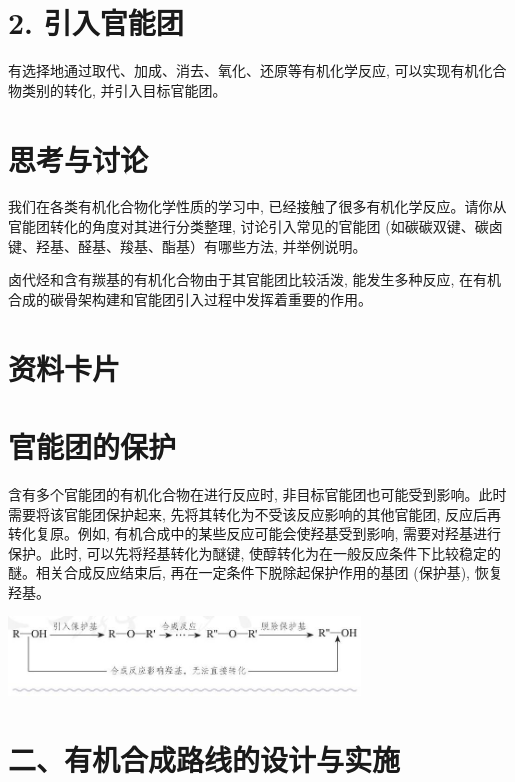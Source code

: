 \documentclass[10pt]{article}
\begin{document}
\section*{2. 引入官能团}

有选择地通过取代、加成、消去、氧化、还原等有机化学反应, 可以实现有机化合物类别的转化, 并引入目标官能团。

\section*{思考与讨论}

我们在各类有机化合物化学性质的学习中, 已经接触了很多有机化学反应。请你从官能团转化的角度对其进行分类整理, 讨论引入常见的官能团 (如碳碳双键、碳卤键、羟基、醛基、羧基、酯基）有哪些方法, 并举例说明。

卤代烃和含有羰基的有机化合物由于其官能团比较活泼, 能发生多种反应, 在有机合成的碳骨架构建和官能团引入过程中发挥着重要的作用。

\section*{资料卡片}

\section*{官能团的保护}

含有多个官能团的有机化合物在进行反应时, 非目标官能团也可能受到影响。此时需要将该官能团保护起来, 先将其转化为不受该反应影响的其他官能团, 反应后再转化复原。例如, 有机合成中的某些反应可能会使羟基受到影响, 需要对羟基进行保护。此时, 可以先将羟基转化为醚键, 使醇转化为在一般反应条件下比较稳定的醚。相关合成反应结束后, 再在一定条件下脱除起保护作用的基团 (保护基), 恢复羟基。

\begin{center}
\includegraphics[max width=0.7\textwidth]{images/0190efc5-b58a-7c43-bfb0-e0a030df9cfd_91_809715.jpg}
\end{center}

\section*{二、有机合成路线的设计与实施}
\end{document}
